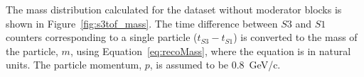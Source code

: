 

The mass distribution calculated for the dataset without moderator blocks is shown in Figure~\ref{fig:s3tof_mass}.
The time difference between $\mathit{S3}$ and $\mathit{S1}$ counters corresponding to a single particle ($t_{\mathit{S3}}-t_{\mathit{S1}}$) is converted to the mass of the particle, $m$, using Equation~\ref{eq:recoMass}, where the equation is in natural units.
The particle momentum, $p$, is assumed to be 0.8~GeV/c.

